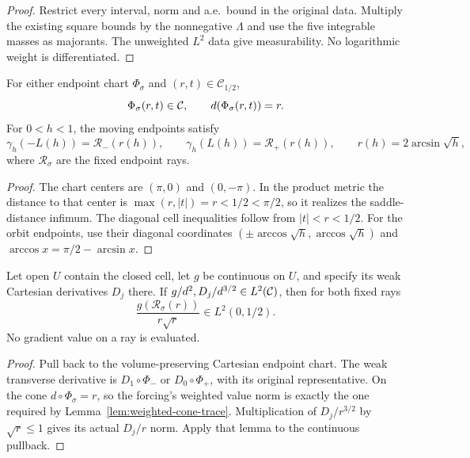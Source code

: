 \begin{proof}
\leanok
Restrict every interval, norm and a.e.\ bound in the original data.
Multiply the existing square bounds by the nonnegative $\Lambda$ and use
the five integrable masses as majorants. The unweighted $L^2$ data give
measurability. No logarithmic weight is differentiated.
\end{proof}

\begin{lemma}
\label{lem:quarter-endpoint-cones}
\leanok
For either endpoint chart $\Phi_\sigma$ and $(r,t)\in\mathcal C_{1/2}$,
\[
 \Phi_\sigma(r,t)\in\mathcal{C},\qquad d(\Phi_\sigma(r,t))=r.
\]
For $0<h<1$, the moving endpoints satisfy
\[
 \gamma_h(-L(h))=\mathcal R_-(r(h)),\qquad
 \gamma_h(L(h))=\mathcal R_+(r(h)),\qquad r(h)=2\arcsin\sqrt h,
\]
where $\mathcal R_\sigma$ are the fixed endpoint rays.
\end{lemma}

\begin{proof}
\leanok
The chart centers are $(\pi,0)$ and $(0,-\pi)$.
In the product metric the distance to that center is
$\max(r,|t|)=r<1/2<\pi/2$, so it realizes the saddle-distance infimum.
The diagonal cell inequalities follow from $|t|<r<1/2$.
For the orbit endpoints, use their diagonal coordinates
$(\pm\arccos\sqrt h,\arccos\sqrt h)$ and
$\arccos x=\pi/2-\arcsin x$.
\end{proof}

\begin{lemma}
\label{lem:weighted-quarter-ray-values}
\leanok
Let open $U$ contain the closed cell, let $g$ be continuous on $U$,
and specify its weak Cartesian derivatives $D_j$ there.
If $g/d^2,D_j/d^{3/2}\in L^2(\mathcal{C})$, then for both fixed rays
\[
 \frac{g(\mathcal R_\sigma(r))}{r\sqrt r}\in L^2(0,1/2).
\]
No gradient value on a ray is evaluated.
\end{lemma}

\begin{proof}
\leanok
Pull back to the volume-preserving Cartesian endpoint chart.
The weak transverse derivative is $D_1\circ\Phi_-$ or
$D_0\circ\Phi_+$, with its original representative.
On the cone $d\circ\Phi_\sigma=r$, so the forcing's weighted value
norm is exactly the one required by Lemma~\ref{lem:weighted-cone-trace}.
Multiplication of $D_j/r^{3/2}$ by $\sqrt r\le1$ gives its actual
$D_j/r$ norm. Apply that lemma to the continuous pullback.
\end{proof}

